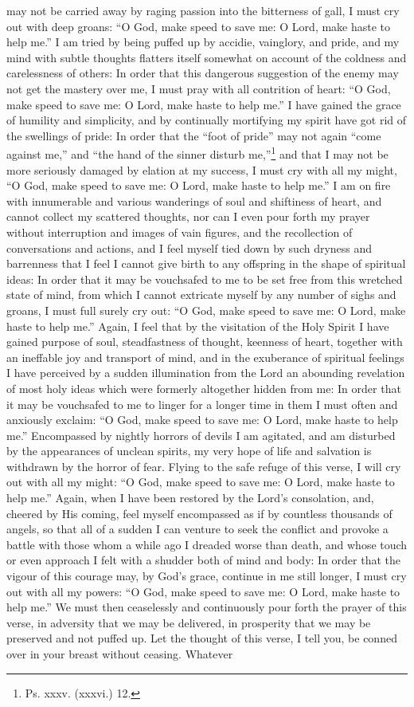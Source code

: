 may not be carried away by raging passion into the bitterness of gall, I must cry out with deep groans: “O God, make speed to save me: O Lord, make haste to help me.” I am tried by being puffed up by accidie, vainglory, and pride, and my mind with subtle thoughts flatters itself somewhat on account of the coldness and carelessness of others: In order that this dangerous suggestion of the enemy may not get the mastery over me, I must pray with all contrition of heart: “O God, make speed to save me: O Lord, make haste to help me.” I have gained the grace of humility and simplicity, and by continually mortifying my spirit have got rid of the swellings of pride: In order that the “foot of pride” may not again “come against me,” and “the hand of the sinner disturb me,”\footnote{Ps. xxxv. (xxxvi.) 12.} and that I may not be more seriously damaged by elation at my success, I must cry with all my might, “O God, make speed to save me: O Lord, make haste to help me.” I am on fire with innumerable and various wanderings of soul and shiftiness of heart, and cannot collect my scattered thoughts, nor can I even pour forth my prayer without interruption and images of vain figures, and the recollection of conversations and actions, and I feel myself tied down by such dryness and barrenness that I feel I cannot give birth to any offspring in the shape of spiritual ideas: In order that it may be vouchsafed to me to be set free from this wretched state of mind, from which I cannot extricate myself by any number of sighs and groans, I must full surely cry out: “O God, make speed to save me: O Lord, make haste to help me.” Again, I feel that by the visitation of the Holy Spirit I have gained purpose of soul, steadfastness of thought, keenness of heart, together with an ineffable joy and transport of mind, and in the exuberance of spiritual feelings I have perceived by a sudden illumination from the Lord an abounding revelation of most holy ideas which were formerly altogether hidden from me: In order that it may be vouchsafed to me to linger for a longer time in them I must often and anxiously exclaim: “O God, make speed to save me: O Lord, make haste to help me.” Encompassed by nightly horrors of devils I am agitated, and am disturbed by the appearances of unclean spirits, my very hope of life and salvation is withdrawn by the horror of fear. Flying to the safe refuge of this verse, I will cry out with all my might: “O God, make speed to save me: O Lord, make haste to help me.” Again, when I have been restored by the Lord’s consolation, and, cheered by His coming, feel myself encompassed as if by countless thousands of angels, so that all of a sudden I can venture to seek the conflict and provoke a battle with those whom a while ago I dreaded worse than death, and whose touch or even approach I felt with a shudder both of mind and body: In order that the vigour of this courage may, by God’s grace, continue in me still longer, I must cry out with all my powers: “O God, make speed to save me: O Lord, make haste to help me.” We must then ceaselessly and continuously pour forth the prayer of this verse, in adversity that we may be delivered, in prosperity that we may be preserved and not puffed up. Let the thought of this verse, I tell you, be conned over in your breast without ceasing. Whatever 